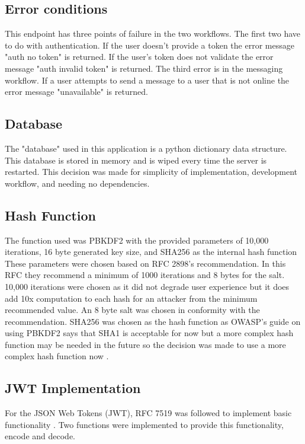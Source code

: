 \subsection{Error conditions}


This endpoint has three points of failure in the two workflows. The first two have to do with authentication. If the user doesn't provide a token the error message "auth no token" is returned. If the user's token does not validate the error message "auth invalid token" is returned. The third error is in the messaging workflow. If a user attempts to send a message to a user that is not online the error message "unavailable" is returned.


\subsection{Database}


The "database" used in this application is a python dictionary data structure. This database is stored in memory and is wiped every time the server is restarted. This decision was made for simplicity of implementation, development workflow, and needing no dependencies. 


\subsection{Hash Function}


The function used was PBKDF2 with the provided parameters of 10,000 iterations, 16 byte generated key size, and SHA256 as the internal hash function \cite{pkcs-rfc}\cite{dsa-rfc} These parameters were chosen based on RFC 2898's recommendation. In this RFC they recommend a minimum of 1000 iterations and 8 bytes for the salt. 10,000 iterations were chosen as it did not degrade user experience but it does add 10x computation to each hash for an attacker from the minimum recommended value. An 8 byte salt was chosen in conformity with the recommendation. SHA256 was chosen as the hash function as OWASP's guide on using PBKDF2 says that SHA1 is acceptable for now but a more complex hash function may be needed in the future so the decision was made to use a more complex hash function now \cite{owasp-pbkdf}.


\subsection{JWT Implementation}


For the JSON Web Tokens (JWT), RFC 7519 was followed to implement basic functionality \cite{jwt-rfc}. Two functions were implemented to provide this functionality, encode and decode.


